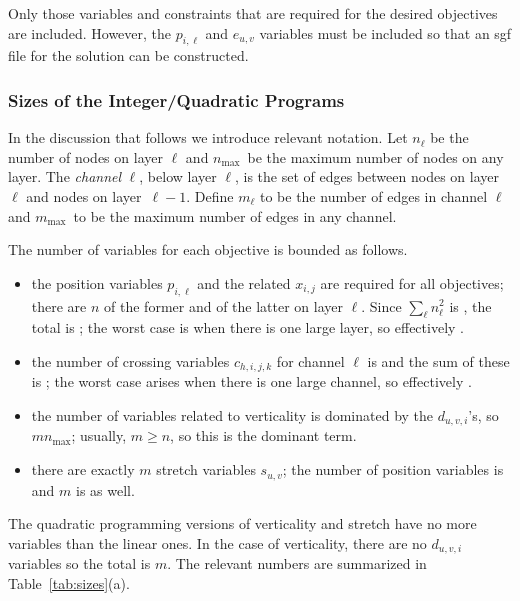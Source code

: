 Only those variables and constraints that are required for the desired objectives are included. However, the $p_{i,\ell}$ and $e_{u,v}$ variables must be included so that an sgf file for the solution can be constructed.

\subsubsection{Sizes of the Integer/Quadratic Programs}

\newcommand{\maxN}{\ensuremath{n_{\max}}}
\newcommand{\maxM}{\ensuremath{m_{\max}}}

In the discussion that follows we introduce relevant notation. Let $n_{\ell}$ be the number of nodes on layer $\ell$ and \maxN\ be the maximum number of nodes on any layer. The \emph{channel} $\ell$, below layer $\ell$, is the set of edges between nodes on layer~$\ell$ and nodes on layer~$\ell-1$. Define $m_{\ell}$ to be the number of edges in channel $\ell$ and \maxM\ to be the maximum number of edges in any channel.

The number of variables for each objective is bounded as follows.
\begin{itemize}
  \item the position variables $p_{i,\ell}$ and the related $x_{i,j}$ are required for all objectives; there are $n$ of the former and  of the latter on layer $\ell$. Since $\sum_{\ell} n_{\ell}^2$ is \OH{\maxN^2}, the total is \OH{\maxN^2}; the worst case is when there is one large layer, so effectively .
  \item the number of crossing variables $c_{h,i,j,k}$ for channel $\ell$ is  and the sum of these is \OH{\maxM^2}; the worst case arises when there is one large channel, so effectively .
  \item the number of variables related to verticality is dominated by the $d_{u,v,i}$'s, so $m\maxN$; usually, $m \geq n$, so this is the dominant term. 
  \item there are exactly $m$ stretch variables $s_{u,v}$; the number of position variables is  and $m$ is  as well.
\end{itemize}
The quadratic programming versions of verticality and stretch have no more variables than the linear ones. In the case of verticality, there are no $d_{u,v,i}$ variables so the total is $m$.
The relevant numbers are summarized in Table~\ref{tab:sizes}(a).

